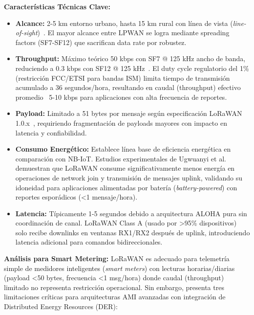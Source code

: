 \textbf{Características Técnicas Clave:}

\begin{itemize}
\item \textbf{Alcance:} 2-5 km entorno urbano, hasta 15 km rural con línea de vista (\textit{line-of-sight})~\cite{ugwuanyiSurveyIoTDeveloping2021}. El mayor alcance entre LPWAN se logra mediante spreading factors (SF7-SF12) que sacrifican data rate por robustez.

\item \textbf{Throughput:} Máximo teórico 50 kbps con SF7 @ 125 kHz ancho de banda, reduciendo a 0.3 kbps con SF12 @ 125 kHz~\cite{chaudhariLPWANTechnologiesEmerging2020}. El duty cycle regulatorio del 1\% (restricción FCC/ETSI para bandas ISM) limita tiempo de transmisión acumulado a 36 segundos/hora, resultando en caudal (throughput) efectivo promedio ~5-10 kbps para aplicaciones con alta frecuencia de reportes.

\item \textbf{Payload:} Limitado a 51 bytes por mensaje según especificación LoRaWAN 1.0.x~\cite{ugwuanyiSurveyIoTDeveloping2021}, requiriendo fragmentación de payloads mayores con impacto en latencia y confiabilidad.

\item \textbf{Consumo Energético:} Establece línea base de eficiencia energética en comparación con NB-IoT. Estudios experimentales de Ugwuanyi et al.~\cite{ugwuanyiSurveyIoTDeveloping2021} demuestran que LoRaWAN consume significativamente menos energía en operaciones de network join y transmisión de mensajes uplink, validando su idoneidad para aplicaciones alimentadas por batería (\textit{battery-powered}) con reportes esporádicos (<1 mensaje/hora).

\item \textbf{Latencia:} Típicamente 1-5 segundos debido a arquitectura ALOHA pura sin coordinación de canal. LoRaWAN Class A (usado por >95\% dispositivos) solo recibe downlinks en ventanas RX1/RX2 después de uplink, introduciendo latencia adicional para comandos bidireccionales.
\end{itemize}

\textbf{Análisis para Smart Metering:} LoRaWAN es adecuado para telemetría simple de medidores inteligentes (\textit{smart meters}) con lecturas horarias/diarias (payload <50 bytes, frecuencia <1 msg/hora) donde caudal (throughput) limitado no representa restricción operacional. Sin embargo, presenta tres limitaciones críticas para arquitecturas AMI avanzadas con integración de Distributed Energy Resources (DER):

